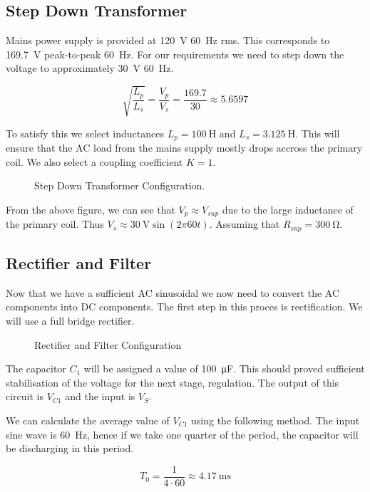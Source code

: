 \documentclass[journal]{IEEEtran}
\begin{document}
\subsection{Step Down Transformer}
Mains power supply is provided at \SI{120}{\volt} \SI{60}{\hertz} rms. This corresponds to \SI{169.7}{\volt} peak-to-peak \SI{60}{\hertz}. For our requirements we need to step down the voltage to approximately \SI{30}{\volt} \SI{60}{\hertz}.

$$ \sqrt{ \frac{L_p}{L_s}}  = \frac{V_p}{V_s} = \frac{169.7}{30} \approx 5.6597 $$

To satisfy this we select inductances $L_p = \SI{100}{\henry}$ and $L_s = \SI{3.125}{\henry}$. This will ensure that the AC load from the mains supply mostly drops accross the primary coil. We also select a coupling coefficient $K = 1$.

\begin{figure}[H]
	\centering
	
	\caption{Step Down Transformer Configuration.}
	\label{t1}
\end{figure}

From the above figure, we can see that $V_p \approx V_{sup}$ due to the large inductance of the primary coil. Thus $V_s \approx \SI{30}{\volt} \sin(2\pi 60t)$. Assuming that $R_{sup} = \SI{300}{\ohm}$.

\subsection{Rectifier and Filter}
Now that we have a sufficient AC sinusoidal we now need to convert the AC components into DC components. The first step in this proces is rectification. We will use a full bridge rectifier.

\begin{figure}[H]
	\centering
	
	\caption{Rectifier and Filter Configuration}
	\label{rf1}
\end{figure}

The capacitor $C_1$ will be assigned a value of \SI{100}{\micro\farad}. This should proved sufficient stabilisation of the voltage for the next stage, regulation. The output of this circuit is $V_{C1}$ and the input is $V_S$.

We can calculate the average value of $V_{C1}$ using the following method. The input sine wave is \SI{60}{\hertz}, hence if we take one quarter of the period, the capacitor will be discharging in this period.

$$ T_0 = \frac{1}{4 \cdot 60} \approx \SI{4.17}{\milli\second} $$
\end{document}
